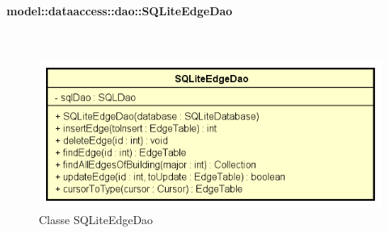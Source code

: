\documentclass[../DefinizioneDiProdotto.tex]{subfiles}
\begin{document}
\paragraph{model::dataaccess::dao::SQLiteEdgeDao}
\
\begin{figure}[H]
	\centering
	\includegraphics[width=\maxwidth]{img/SQLiteEdgeDao.png}
	\caption{Classe SQLiteEdgeDao}\label{fig:model::dataaccess::dao::SQLiteEdgeDao} 
\end{figure}
\end{document}
